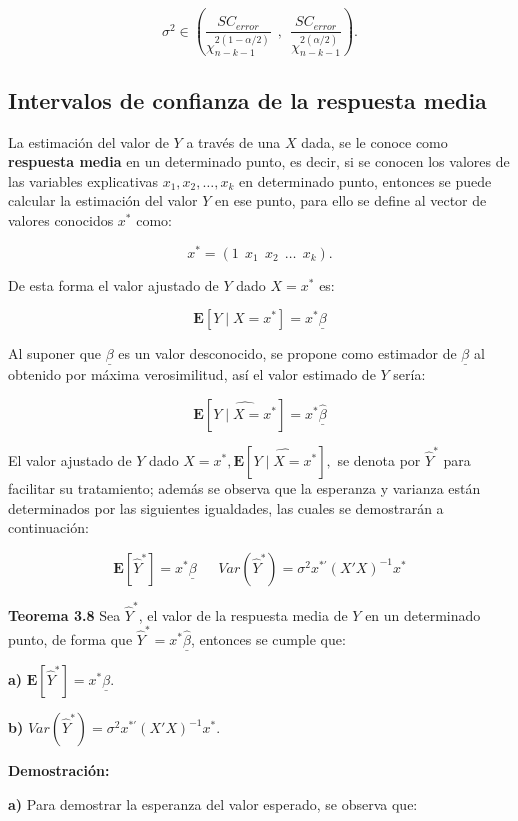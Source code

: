 \documentclass[a4paper,oneside,openany]{book}
\begin{document}
\[\sigma^2 \in \left(\frac{SC_{error}}{\chi^{2(1-\alpha/2)}_{n-k-1}}\ \ , \ \ \frac{SC_{error}}{\chi^{2(\alpha/2)}_{n-k-1}}\right).\]

\subsection{Intervalos de confianza de la respuesta
media}\label{intervalos-de-confianza-de-la-respuesta-media}

La estimación del valor de \(Y\) a través de una \(X\) dada, se le
conoce como \textbf{respuesta media} en un determinado punto, es decir,
si se conocen los valores de las variables explicativas
\(x_{1},x_{2}, \ldots , x_{k}\) en determinado punto, entonces se puede
calcular la estimación del valor \(Y\) en ese punto, para ello se define
al vector de valores conocidos \(x^*\) como:

\[x^*= \left( 1 \ \ x_{1} \ \ x_{2} \ \ \ldots \ \ x_{k}\right).\]

De esta forma el valor ajustado de \(Y\) dado \(X=x^*\) es:

\[\mathbf{E}[Y \mid X=x^*]=x^*\underline{\beta}\]

Al suponer que \(\underline{\beta}\) es un valor desconocido, se propone
como estimador de \(\underline{\beta}\) al obtenido por máxima
verosimilitud, así el valor estimado de \(Y\) sería:

\[\mathbf{E}\left[ \widehat{Y \mid X = x^*}\right]=x^*\underline{\hat{\beta}}\]

El valor ajustado de \(Y\) dado
\(X=x^*,\mathbf{E}\left[ \widehat{Y \mid X = x^*}\right],\) se denota
por \(\hat{Y}^*\) para facilitar su tratamiento; además se observa que
la esperanza y varianza están determinados por las siguientes
igualdades, las cuales se demostrarán a continuación:

\[\mathbf{E}[\hat{Y}^*]= x^*\underline{\beta} \ \ \ \ \ \ \ Var(\hat{Y}^*)=\sigma^2 x^{*'}(X'X)^{-1}x^*\]

\textbf{Teorema 3.8} Sea \(\hat{Y}^*\), el valor de la respuesta media
de \(Y\) en un determinado punto, de forma que
\(\hat{Y}^*=x^*\underline{\hat{\beta}}\), entonces se cumple que:

\textbf{a)} \(\mathbf{E}[\hat{Y}^*]= x^*\underline{\beta}.\)

\textbf{b)} \(Var(\hat{Y}^*)=\sigma^2 x^{*'}(X'X)^{-1}x^*.\)

\textbf{Demostración:}

\textbf{a)} Para demostrar la esperanza del valor esperado, se observa
que:
\end{document}
